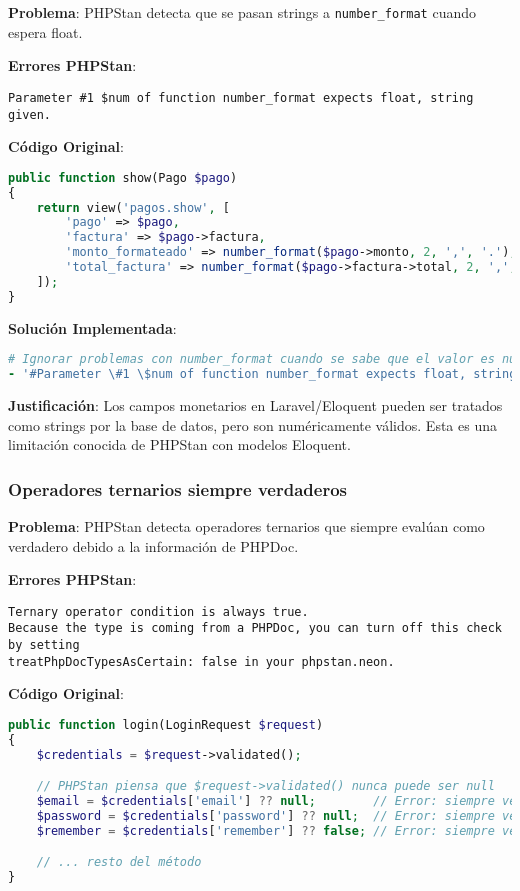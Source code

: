 \documentclass[12pt,a4paper]{article}
\begin{document}
\textbf{Problema}: PHPStan detecta que se pasan strings a \texttt{number\_format} cuando espera float.

\textbf{Errores PHPStan}:
\begin{lstlisting}[caption=Errores en PagoController.php]
Parameter #1 $num of function number_format expects float, string given.
\end{lstlisting}

\textbf{Código Original}:
\begin{lstlisting}[language=php, caption=PagoController.php - Problemas de tipos]
public function show(Pago $pago)
{
    return view('pagos.show', [
        'pago' => $pago,
        'factura' => $pago->factura,
        'monto_formateado' => number_format($pago->monto, 2, ',', '.'),  // Error: string
        'total_factura' => number_format($pago->factura->total, 2, ',', '.'), // Error: string
    ]);
}
\end{lstlisting}

\textbf{Solución Implementada}:
\begin{lstlisting}[language=yaml, caption=Ignorado inteligente en phpstan.neon]
# Ignorar problemas con number_format cuando se sabe que el valor es numérico
- '#Parameter \#1 \$num of function number_format expects float, string given#'
\end{lstlisting}

\textbf{Justificación}: Los campos monetarios en Laravel/Eloquent pueden ser tratados como strings por la base de datos, pero son numéricamente válidos. Esta es una limitación conocida de PHPStan con modelos Eloquent.

\subsubsection{Operadores ternarios siempre verdaderos}

\textbf{Problema}: PHPStan detecta operadores ternarios que siempre evalúan como verdadero debido a la información de PHPDoc.

\textbf{Errores PHPStan}:
\begin{lstlisting}[caption=Errores en AuthController.php]
Ternary operator condition is always true.
Because the type is coming from a PHPDoc, you can turn off this check by setting
treatPhpDocTypesAsCertain: false in your phpstan.neon.
\end{lstlisting}

\textbf{Código Original}:
\begin{lstlisting}[language=php, caption=AuthController.php - Operadores ternarios]
public function login(LoginRequest $request)
{
    $credentials = $request->validated();

    // PHPStan piensa que $request->validated() nunca puede ser null
    $email = $credentials['email'] ?? null;        // Error: siempre verdadero
    $password = $credentials['password'] ?? null;  // Error: siempre verdadero
    $remember = $credentials['remember'] ?? false; // Error: siempre verdadero

    // ... resto del método
}
\end{lstlisting}
\end{document}
